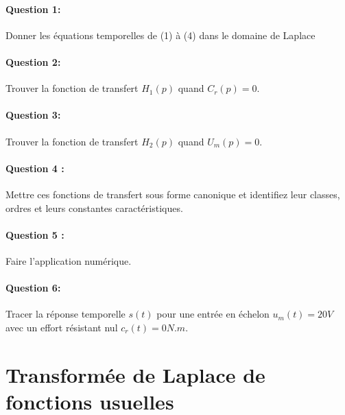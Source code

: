 \paragraph{Question 1:} Donner les équations temporelles de (1) à (4) dans le domaine de Laplace

\paragraph{Question 2:} Trouver la fonction de transfert $H_1(p)$ quand $C_r(p)=0$.

\paragraph{Question 3:} Trouver la fonction de transfert $H_2(p)$ quand $U_m(p)=0$.

\paragraph{Question 4 :} Mettre ces fonctions de transfert sous forme canonique et identifiez leur classes, ordres et leurs constantes caractéristiques.

\paragraph{Question 5 :} Faire l'application numérique.

\paragraph{Question 6:} Tracer la réponse temporelle $s(t)$ pour une entrée en échelon $u_m(t)=20V$ avec un effort résistant nul $c_r(t)=0N.m$.

\section{Transformée de Laplace de fonctions usuelles}

